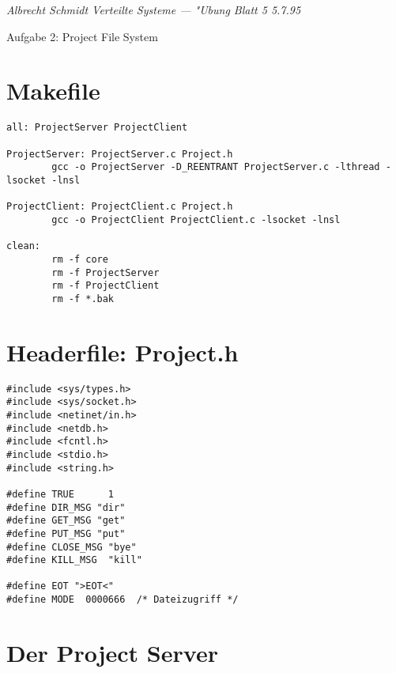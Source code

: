 \parindent0pt


{\it Albrecht Schmidt \hfill Verteilte Systeme --- "Ubung Blatt 5 \hfill 5.7.95} \\

\vspace{5mm}

{\Large Aufgabe 2: Project File System}

\section{Makefile}

\vspace{3mm}
\begin{verbatim}
all: ProjectServer ProjectClient

ProjectServer: ProjectServer.c Project.h
        gcc -o ProjectServer -D_REENTRANT ProjectServer.c -lthread -lsocket -lnsl

ProjectClient: ProjectClient.c Project.h
        gcc -o ProjectClient ProjectClient.c -lsocket -lnsl

clean:
        rm -f core
       	rm -f ProjectServer 
       	rm -f ProjectClient 
       	rm -f *.bak
\end{verbatim}
 
\section{Headerfile: Project.h} 
 
\vspace{3mm} 
\begin{verbatim}
#include <sys/types.h>
#include <sys/socket.h>
#include <netinet/in.h>
#include <netdb.h>
#include <fcntl.h>
#include <stdio.h>
#include <string.h>

#define TRUE      1
#define DIR_MSG "dir"
#define GET_MSG "get"
#define PUT_MSG "put"
#define CLOSE_MSG "bye"
#define KILL_MSG  "kill"

#define EOT ">EOT<"
#define MODE  0000666  /* Dateizugriff */
\end{verbatim}
        
\pagebreak

\section{Der Project Server}         
 
